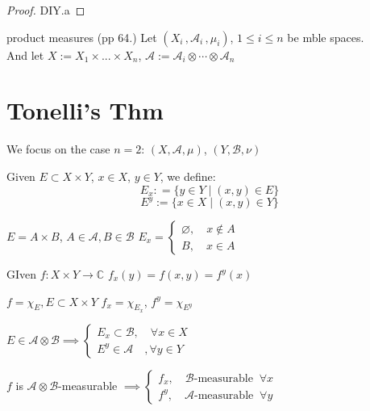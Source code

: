 \documentclass[lang=cn,11pt]{elegantbook}
\begin{document}
\begin{proof}
    DIY.a
\end{proof}

\begin{definition}{product measures}
    (pp 64.) Let $(X_i \,,\mathcal{A}_i\, , \mu_i)$, $1 \leq i \leq n$ be mble spaces.\\
    And let $X := X_1 \times ... \times X_n$, $\mathcal{A}:= \mathcal{A}_i \otimes \cdots \otimes \mathcal{A}_n$

    
\end{definition}



\chapter{Tonelli's Thm}

We focus on the case $n=2$: $(X,\mathcal{A}, \mu)$, $(Y, \mathcal{B}, \nu)$

\begin{definition}
    Given $E \subset X \times Y$, $x \in X$, $y\in Y$, we define:
\[E_x : = \{  y\in Y \mid (x,y) \in E \}\]
\[
E^y := \{x\in X \mid (x,y) \in Y  \}
\]
\end{definition}


\begin{example}
    $E = A \times B $, $A \in \mathcal{A}, B \in \mathcal{B}$
    $E_x = \begin{cases}
        \varnothing ,\quad x\not\in A \\
        B ,\quad x\in A
    \end{cases}$


GIven $f: X \times Y \to \mathbb{C}$
$f_x(y) =  f(x,y) = f^y(x)$


$f = \chi_E, E \subset X \times Y$
$f_x = \chi_{E_x}$, $f^y = \chi_{E^y}$
\end{example}



\begin{proposition}
    $E \in \mathcal{A} \otimes \mathcal{B} \implies \begin{cases}
        E_x \subset \mathcal{B},\quad \forall x \in X\\
        E^y \in \mathcal{A}\quad, \forall y \in Y
    \end{cases}$

    $f$ is $\mathcal{A} \otimes \mathcal{B}$-measurable $\implies \begin{cases}
        f_x, \quad \mathcal{B}\text{-measurable} \;\;\forall x \\
         f^y, \quad \mathcal{A}\text{-measurable} \;\;\forall y
    \end{cases}$ \\
\end{proposition}
\end{document}
